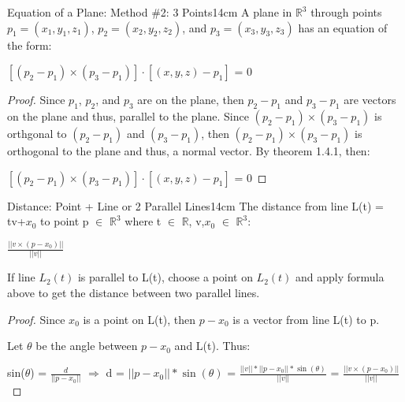     \newpage



    \begin{wtheorem}{Equation of a Plane: Method \#2: 3 Points}{14cm}
        A plane in $\mathbb{R}^3$ through points
        $p_1 = (x_1,y_1,z_1)$, $p_2 = (x_2,y_2,z_2)$, and $p_3 = (x_3,y_3,z_3)$
        has an equation of the form:

        \hspace{0.5cm}
        $[(p_2 - p_1) \times (p_3 - p_1)] \cdot [(x,y,z) - p_1]$ = 0
    \end{wtheorem}

    \begin{proof}
        Since $p_1$, $p_2$, and $p_3$ are on the plane, then
        $p_2-p_1$ and $p_3-p_1$ are vectors on the plane and thus, parallel to
        the plane.
        Since $(p_2 - p_1) \times (p_3 - p_1)$ is orthgonal to
        $(p_2 - p_1)$ and $(p_3 - p_1)$, then $(p_2 - p_1) \times (p_3 - p_1)$
        is orthogonal to the plane and thus, a normal vector.
        By {\color{red} theorem 1.4.1}, then:

        \hspace{0.5cm}
        $[(p_2 - p_1) \times (p_3 - p_1)] \cdot [(x,y,z) - p_1]$ = 0
    \end{proof}

    \vspace{0.5cm}



    \begin{wtheorem}{Distance: Point + Line or 2 Parallel Lines}{14cm}
        The distance from line L(t) = tv+$x_0$ to point p $\in$ $\mathbb{R}^3$
        where t $\in$ $\mathbb{R}$, v,$x_0$ $\in$ $\mathbb{R}^3$:

        \hspace{0.5cm}
        $\frac{||v \times (p - x_0)||}{||v||}$

        If line $L_2(t)$ is parallel to L(t), choose a point on $L_2(t)$
        and apply formula above to get the distance between two parallel lines.
    \end{wtheorem}

    \begin{proof}
        Since $x_0$ is a point on L(t), then
        $p - x_0$ is a vector from line L(t) to p.

        Let $\theta$ be the angle between $p - x_0$
        and L(t). Thus:

        \hspace{0.5cm}
        sin($\theta$) = $\frac{d}{||p - x_0||}$
        \hspace{0.5cm}
        $\Rightarrow$
        \hspace{0.5cm}
        d = $||p - x_0|| * \sin(\theta)$
        = $\frac{||v|| * ||p - x_0|| * \sin(\theta)}{||v||}$
        = $\frac{||v \times (p - x_0)||}{||v||}$
    \end{proof}

